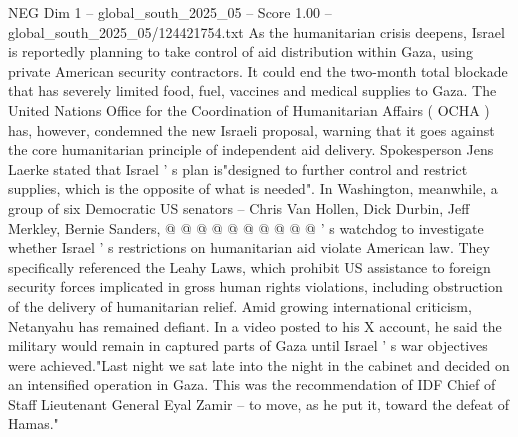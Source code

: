 \begin{textsample}{NEG Dim 1 – global\_south\_2025\_05 – Score 1.00 – global\_south\_2025\_05/124421754.txt}
As the humanitarian crisis deepens, Israel is reportedly planning to take control of aid distribution within Gaza, using private American security contractors.
It could end the two-month total blockade that has severely limited food, fuel, vaccines and medical supplies to Gaza.
The United Nations Office for the Coordination of Humanitarian Affairs ( OCHA ) has, however, condemned the new Israeli proposal, warning that it goes against the core humanitarian principle of independent aid delivery.
Spokesperson Jens Laerke stated that Israel ' s plan is"designed to further control and restrict supplies, which is the opposite of what is needed".
In Washington, meanwhile, a group of six Democratic US senators -- Chris Van Hollen, Dick Durbin, Jeff Merkley, Bernie Sanders, @ @ @ @ @ @ @ @ @ @ ' s watchdog to investigate whether Israel ' s restrictions on humanitarian aid violate American law.
They specifically referenced the Leahy Laws, which prohibit US assistance to foreign security forces implicated in gross human rights violations, including obstruction of the delivery of humanitarian relief.
Amid growing international criticism, Netanyahu has remained defiant.
In a video posted to his X account, he said the military would remain in captured parts of Gaza until Israel ' s war objectives were achieved."Last night we sat late into the night in the cabinet and decided on an intensified operation in Gaza.
This was the recommendation of IDF Chief of Staff Lieutenant General Eyal Zamir -- to move, as he put it, toward the defeat of Hamas."

\end{textsample}
